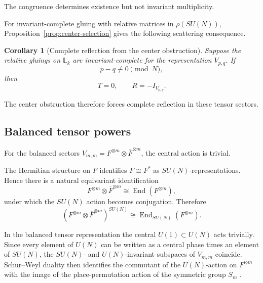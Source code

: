 \documentclass[11pt]{article}
\theoremstyle{plain}
\newtheorem{corollary}[theorem]{Corollary}
\theoremstyle{definition}
\begin{document}
The congruence determines existence but not invariant multiplicity.

For invariant-complete gluing with relative matrices in \(\rho(SU(N))\),
Proposition~\ref{prop:center-selection} gives the following scattering
consequence.

\begin{corollary}[Complete reflection from the center obstruction]
\label{cor:center-reflection}
Suppose the relative gluings on \(\mathbb L_k\) are invariant-complete for the
representation \(V_{p,q}\). If
\[
p-q\not\equiv0\pmod N,
\]
then
\[
T=0,
\qquad
R=-I_{V_{p,q}}.
\]
\end{corollary}

The center obstruction therefore forces complete reflection in these tensor sectors.

\subsection{Balanced tensor powers}
\label{subsec:balanced-tensors}

For the balanced sectors
\(V_{m,m} = F^{\otimes m}\otimes\overline F^{\otimes m}\),
the central action is trivial.

The Hermitian structure on \(F\) identifies \(\overline F\cong F^\ast\) as \(SU(N)\)-representations. Hence there is a natural equivariant
identification
\begin{equation}
\label{eq:balanced-End}
F^{\otimes m}\otimes\overline F^{\otimes m}
\cong
\operatorname{End}(F^{\otimes m}),
\end{equation}
under which the \(SU(N)\) action becomes conjugation. Therefore
\begin{equation}
\label{eq:balanced-commutant}
\left(
F^{\otimes m}\otimes\overline F^{\otimes m}
\right)^{SU(N)}
\cong
\operatorname{End}_{SU(N)}(F^{\otimes m}).
\end{equation}

In the balanced tensor representation the central
\(U(1)\subset U(N)\) acts trivially. Since every element of \(U(N)\) can
be written as a central phase times an element of \(SU(N)\), the
\(SU(N)\)- and \(U(N)\)-invariant subspaces of \(V_{m,m}\) coincide.
Schur--Weyl duality then identifies the commutant of the \(U(N)\)-action
on \(F^{\otimes m}\) with the image of the place-permutation action of the
symmetric group \(S_m\)
\citep{FultonHarris1991,GoodmanWallach2009}.
\end{document}
